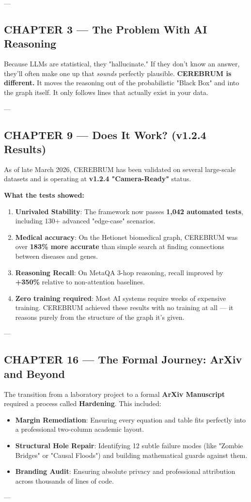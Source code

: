 \documentclass[11pt,article,oneside]{memoir}
\begin{document}
---

\subsection{CHAPTER 3 — The Problem With AI Reasoning}
Because LLMs are statistical, they "hallucinate." If they don't know an answer, they'll often make one up that \textit{sounds} perfectly plausible. \textbf{CEREBRUM is different.} It moves the reasoning out of the proba\-bilistic "Black Box" and into the graph itself. It only follows lines that actually exist in your data.

---

\subsection{CHAPTER 9 — Does It Work? (v1.2.4 Results)}
As of late March 2026, CEREBRUM has been validated on several large-scale datasets and is operating at \textbf{v1.2.4 "Camera-Ready"} status.

\textbf{What the tests showed:}
\begin{enumerate}
\item \textbf{Unrivaled Stability}: The framework now passes \textbf{1,042 automated tests}, including 130+ advanced "edge-case" scenarios.
\item \textbf{Medical accuracy}: On the Hetionet biomedical graph, CEREBRUM was over \textbf{183\% more accurate} than simple search at finding connections between diseases and genes.
\item \textbf{Reasoning Recall}: On MetaQA 3-hop reasoning, recall improved by \textbf{+350\%} relative to non-attention baselines.
\item \textbf{Zero training required}: Most AI systems require weeks of expensive training. CEREBRUM achieved these results with no training at all — it reasons purely from the structure of the graph it's given.

\end{enumerate}
---

\subsection{CHAPTER 16 — The Formal Journey: ArXiv and Beyond}
The transition from a laboratory project to a formal \textbf{ArXiv Manuscript} required a process called \textbf{Hardening}. This included:
\begin{itemize}
\item \textbf{Margin Remediation}: Ensuring every equation and table fits perfectly into a profe\-ssional two-column academic layout.
\item \textbf{Structural Hole Repair}: Identifying 12 subtle failure modes (like "Zombie Bridges" or "Causal Floods") and building mathe\-matical guards against them.
\item \textbf{Branding Audit}: Ensuring absolute privacy and profe\-ssional attribution across thousands of lines of code.

\end{itemize}
---
\end{document}
